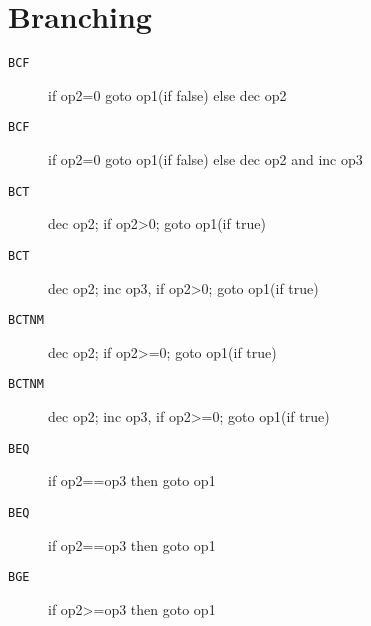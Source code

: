 \section{Branching}
\begin{description}
\item[\texttt{BCF        }]  if op2=0 goto op1(if false) else dec op2\\
\end{description}

\begin{description}
\item[\texttt{BCF        }]  if op2=0 goto op1(if false) else dec op2 and inc op3\\
\end{description}

\begin{description}
\item[\texttt{BCT        }]  dec op2; if op2>0; goto op1(if true)\\
\end{description}

\begin{description}
\item[\texttt{BCT        }]  dec op2; inc op3, if op2>0; goto op1(if true)\\
\end{description}

\begin{description}
\item[\texttt{BCTNM      }]  dec op2; if op2>=0; goto op1(if true)\\
\end{description}

\begin{description}
\item[\texttt{BCTNM      }]  dec op2; inc op3, if op2>=0; goto op1(if true)\\
\end{description}

\begin{description}
\item[\texttt{BEQ        }]  if op2==op3 then goto op1\\
\end{description}

\begin{description}
\item[\texttt{BEQ        }]  if op2==op3 then goto op1\\
\end{description}

\begin{description}
\item[\texttt{BGE        }]  if op2>=op3 then goto op1\\
\end{description}
